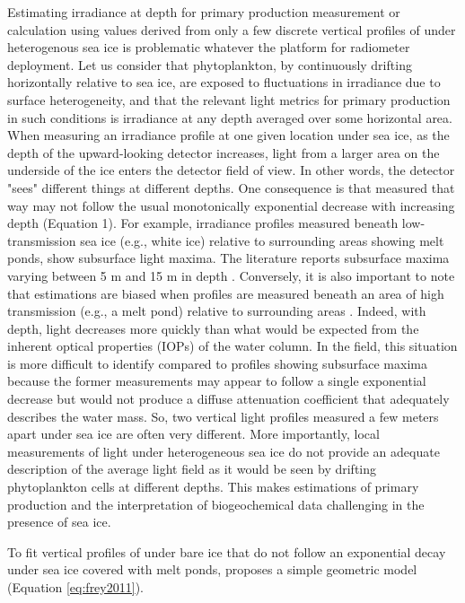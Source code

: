 Estimating irradiance at depth for primary production measurement or calculation using \ked{} values derived from only a few discrete vertical profiles of \edz{} under heterogenous sea ice is problematic whatever the platform for radiometer deployment. Let us consider that phytoplankton, by continuously drifting horizontally relative to sea ice, are exposed to fluctuations in irradiance due to surface heterogeneity, and that the relevant light metrics for primary production in such conditions is irradiance at any depth averaged over some horizontal area. When measuring an irradiance profile at one given location under sea ice, as the depth of the upward-looking detector increases, light from a larger area on the underside of the ice enters the detector field of view. In other words, the detector "sees" different things at different depths. One consequence is that \edz{} measured that way may not follow the usual monotonically exponential decrease with increasing depth (Equation 1). For example, irradiance profiles measured beneath low-transmission sea ice (e.g., white ice) relative to surrounding areas showing melt ponds, show subsurface light maxima. The literature reports subsurface maxima varying between 5 m and 15 m in depth \citep{Frey2011, Katlein2016, Laney2017}. Conversely, it is also important to note that \ked{} estimations are biased when profiles are measured beneath an area of high transmission (e.g., a melt pond) relative to surrounding areas \citep{Katlein2016}. Indeed, with depth, light decreases more quickly than what would be expected from the inherent optical properties (IOPs) of the water column. In the field, this situation is more difficult to identify compared to profiles showing subsurface maxima because the former measurements may appear to follow a single exponential decrease but would not produce a diffuse attenuation coefficient that adequately describes the water mass. So, two vertical light profiles measured a few meters apart under sea ice are often very different. More importantly, local measurements of light under heterogeneous sea ice do not provide an adequate description of the average light field as it would be seen by drifting phytoplankton cells at different depths. This makes estimations of primary production and the interpretation of biogeochemical data challenging in the presence of sea ice.

To fit vertical profiles of \edz{} under bare ice that do not follow an exponential decay under sea ice covered with melt ponds, \citet{Frey2011} proposes a simple geometric model (Equation \ref{eq:frey2011}). 

